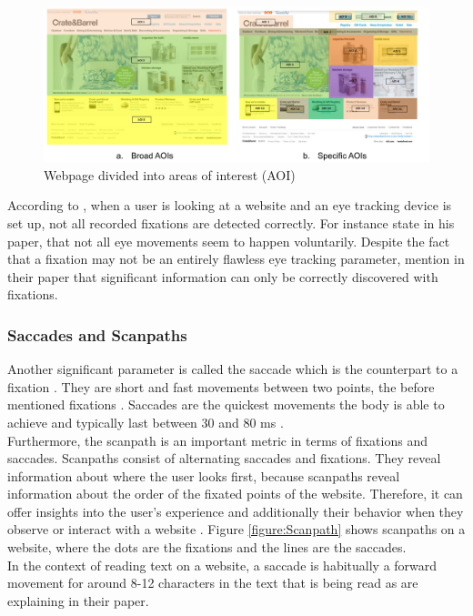 \begin{figure}[t]
    \centering
    \includegraphics[width=1\linewidth]{images/AOI_djamasbi2014eye.png}
    \caption{
        Webpage divided into areas of interest (AOI) \autocite[48]{djamasbi2014eye}
    }
    \label{figure:AOI}
\end{figure}

According to \textcite[]{grzyb2016eye}, when a user is looking at a website and an eye tracking device is set up, not all recorded fixations are detected correctly.
For instance \textcite[]{bruneau2002eyes} state in his paper, that not all eye movements seem to happen voluntarily. 
Despite the fact that a fixation may not be an entirely flawless eye tracking parameter, \textcite[]{biedert2010eyebook} mention in their paper that significant information can only be correctly discovered with fixations.

\subsubsection{Saccades and Scanpaths}
Another significant parameter is called the saccade which is the counterpart to a fixation \autocite{goldberg2003eye}. They are short and fast movements between two points, the before mentioned fixations \autocite{goldberg2003eye, beymer2007eye}. Saccades are the quickest movements the body is able to achieve and typically last between 30 and 80 ms \autocite[]{blascheck2014state}. \\
Furthermore, the scanpath is an important metric in terms of fixations and saccades. Scanpaths consist of alternating saccades and fixations. They reveal information about where the user looks first, because scanpaths reveal information about the order of the fixated points of the website. Therefore, it can offer insights into the user's experience and additionally their behavior when they observe or interact with a website \autocite[]{lorigo2008eye, blascheck2014state}. Figure \ref{figure:Scanpath} shows scanpaths on a website, where the dots are the fixations and the lines are the saccades. \\
In the context of reading text on a website, a saccade is habitually a forward movement for around 8-12 characters in the text that is being read as \textcite[]{beymer2007eye} are explaining in their paper.

